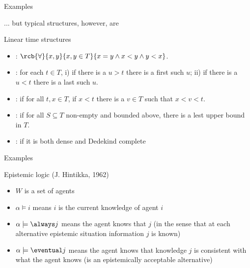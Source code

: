 \documentclass{beamer}
\begin{document}
\begin{slide}{Examples}\label{s:18b}
\small

... but typical structures, however, are 

\begin{block}{Linear time structures}
\begin{itemize}
\item {}: $\rcb{\forall}{x,y}{x,y \in T}{x=y \wedge x<y \wedge y<x}$.
\item {}: for each $t\in T$, i) if there is a $u>t$ there is a first such $u$; ii) if there is a $u<t$ there is a last such $u$.
\item {}: if for all $t,x \in T$, if $x<t$ there is a $v\in T$ such that $x<v<t$.
\item {}: if for all $S\subseteq T$ non-empty and bounded above, there is a lest upper bound in $T$.
\item {}: if it is both dense and Dedekind complete
\end{itemize}
\end{block}
\end{slide}





\begin{slide}{Examples}\label{s:19}
\small
\begin{block}{Epistemic logic (J. Hintikka, 1962)}
\begin{itemize}
\item $W$ is a set of agents 
\item $\alpha \models i$ means $i$ is the current knowledge of agent $i$
\item $\alpha \models \always j$ means the agent knows that $j$ (in the sense that at each alternative epistemic situation information $j$ is known) 
\item $\alpha \models \eventual j$ means the agent knows that  knowledge $j$ is consistent with what the agent knows (is an epistemically acceptable alternative)
\end{itemize}
\end{block}
\end{slide}
\end{document}
